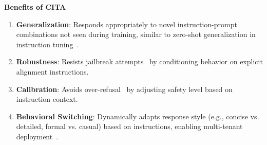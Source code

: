 \textbf{Benefits of CITA}
\label{sec:benefits}

\begin{enumerate}[leftmargin=*,itemsep=2pt]
    \item \textbf{Generalization}: Responds appropriately to novel instruction-prompt combinations not seen during training, similar to zero-shot generalization in instruction tuning~\cite{wei2022finetuned,chung2022scaling}.

    \item \textbf{Robustness}: Resists jailbreak attempts~\cite{zou2023universal,wei2023jailbroken} by conditioning behavior on explicit alignment instructions.

    \item \textbf{Calibration}: Avoids over-refusal~\cite{bianchi2023safetytuned} by adjusting safety level based on instruction context.

    \item \textbf{Behavioral Switching}: Dynamically adapts response style (e.g., concise vs. detailed, formal vs. casual) based on instructions, enabling multi-tenant deployment~\cite{wang2024survey}.
\end{enumerate}

































